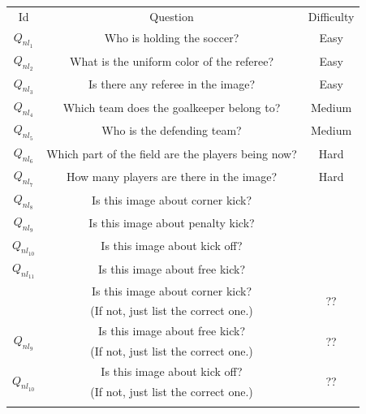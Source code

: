 \begin{table}[thb]
	\renewcommand{\arraystretch}{1}
	\begin{center}
		\footnotesize		
		\begin{tabular}{c|c|c}
			\Xhline{1pt}
			Id & Question                                           & Difficulty \\ \Xhline{0.7pt}
			$Q_{nl_1}$  & Who is holding the soccer?                         & Easy       \\ \hline
			$Q_{nl_2}$  & What is the uniform color of the referee?           & Easy       \\ \hline
			$Q_{nl_3}$  & Is there any referee in the image?                 & Easy       \\ \hline
			$Q_{nl_4}$  & Which team does the goalkeeper belong to?          & Medium       \\ \hline
			$Q_{nl_5}$  & Who is the defending team?                         & Medium       \\ \hline
			$Q_{nl_6}$  & Which part of the field are the players being now? & Hard       \\ \hline
			$Q_{nl_7}$  & How many players are there in the image?           & Hard     \\ \hline
			$Q_{nl_8}$  & {\color{red}Is this image about corner kick?}                   & 
			\\ \hline
			$Q_{nl_9}$  & Is this image about penalty kick?                   & 
			\\ \hline
			$Q_{nl_10}$  & Is this image about kick off?                     & 
			\\ \hline
			$Q_{nl_{11}}$  & Is this image about free kick?                  & 
			\\ \hline
			\eat{
			\multirow{2}{*}{$Q_{nl_8}$ }
			& Is this image about corner kick?           &  \multirow{2}{*}{\color{red}??}  \\ 
			& {\color{red}(If not, just list the correct one.)}  & \\ \hline
			
			\multirow{2}{*}{$Q_{nl_{9}}$}  &  Is this image about free kick?  &  \multirow{2}{*}{\color{red}??}    \\ 
			& {\color{red}(If not, just list the correct one.)}  &  \\ \hline
			
			\multirow{2}{*}{$Q_{nl_{10}}$}  &  Is this image about kick off?  &  \multirow{2}{*}{\color{red}??}    \\ 
			& {\color{red}(If not, just list the correct one.)}  &  \\ \hline
			
}
\end{tabular}
\end{center}
\end{table}
